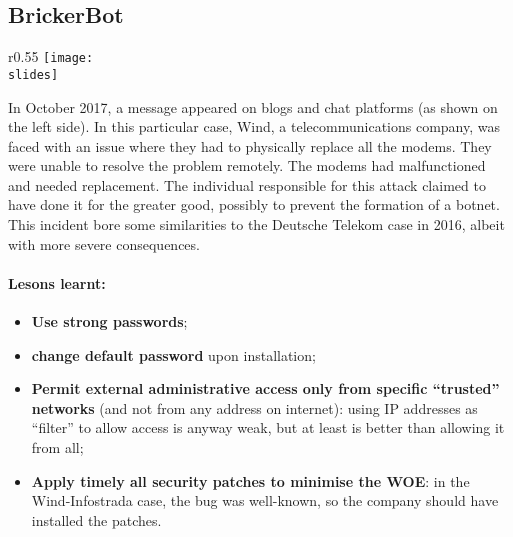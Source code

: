 \subsection*{BrickerBot}
\begin{wrapfigure}{r}{0.55\textwidth}
  \centering
  \texttt{[image: \\slides]}
\end{wrapfigure}
In October 2017, a message appeared on blogs and chat platforms (as shown on the left side). In this particular case, Wind, a telecommunications company, was faced with an issue where they had to physically replace all the modems. They were unable to resolve the problem remotely. The modems had malfunctioned and needed replacement. The individual responsible for this attack claimed to have done it for the greater good, possibly to prevent the formation of a botnet. This incident bore some similarities to the Deutsche Telekom case in 2016, albeit with more severe consequences.

\paragraph*{Lesons learnt:}
\begin{itemize}
  \item \textbf{Use strong passwords};
  \item \textbf{change default password} upon installation;
  \item \textbf{Permit external administrative access only from specific “trusted” networks} (and not from any address on internet): using IP addresses as “filter” to allow access is anyway weak, but at least is
        better than allowing it from all;
  \item \textbf{Apply timely all security patches to minimise the WOE}: in the Wind-Infostrada case, the bug was
        well-known, so the company should have installed the patches.
\end{itemize}

